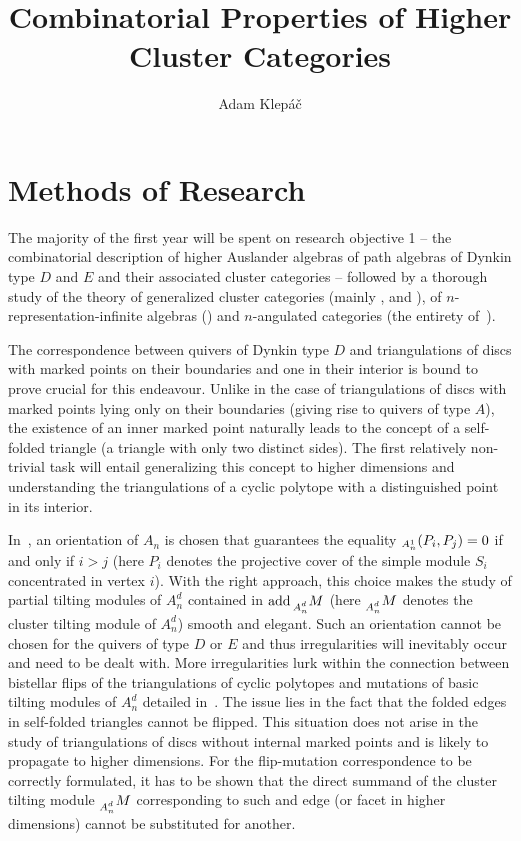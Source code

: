 \documentclass[a4paper,oneside,svgnames]{amsart}
\title{Combinatorial Properties of Higher Cluster Categories}
\author{Adam Klepáč}
\theoremstyle{plain}
\theoremstyle{definition}
\let\hom\relax
\DeclareMathOperator{\add}{add}
\DeclareMathOperator{\hom}{Hom}
\begin{document}
 \maketitle
 \section*{Methods of Research}
 \setcounter{section}{1}

 The majority of the first year will be spent on research objective 1 -- the
 combinatorial description of higher Auslander algebras of path algebras of
 Dynkin type $D$ and $E$ and their associated cluster categories -- followed by
 a thorough study of the theory of generalized cluster categories (mainly
 \cite[Sections 3 and 4]{amiot1}, \cite[Chapters 5,6 and 7]{amiot2} and
 \cite[Chapters 2 and 3]{guo}), of $n$-representation-infinite algebras
 (\cite[Sections 1-5]{hio}) and $n$-angulated categories (the entirety
 of~\cite{gko}).

 The correspondence between quivers of Dynkin type $D$ and triangulations of
 discs with marked points on their boundaries and one in their interior is bound
 to prove crucial for this endeavour. Unlike in the case of triangulations of
 discs with marked points lying only on their boundaries (giving rise to quivers
 of type $A$), the existence of an inner marked point naturally leads to the
 concept of a self-folded triangle (a triangle with only two distinct sides).
 The first relatively non-trivial task will entail generalizing this concept to
 higher dimensions and understanding the triangulations of a cyclic polytope
 with a distinguished point in its interior.

 In~\cite[Section 3]{ot}, an orientation of $A_n$ is chosen that guarantees the
 equality $\hom_{A^{1}_n}(P_i,P_j) = 0$ if and only if $i > j$ (here $P_i$ denotes the
 projective cover of the simple module $S_i$ concentrated in vertex $i$). With
 the right approach, this choice makes the study of partial tilting modules of
 $A^{d}_n$ contained in $\add \prescript{}{A^{d}_n}{M}$ (here
 $\prescript{}{A^{d}_n}{M}$ denotes the cluster tilting module of $A^{d}_n$)
 smooth and elegant. Such an orientation cannot be chosen for the quivers of
 type $D$ or $E$ and thus irregularities will inevitably occur and need to be
 dealt with. More irregularities lurk within the connection between bistellar
 flips of the triangulations of cyclic polytopes and mutations of basic tilting
 modules of $A^{d}_n$ detailed in~\cite[Section 4]{ot}. The issue lies in the
 fact that the folded edges in self-folded triangles cannot be flipped. This
 situation does not arise in the study of triangulations of discs without
 internal marked points and is likely to propagate to higher dimensions. For
 the flip-mutation correspondence to be correctly formulated, it has to be 
 shown that the direct summand of the cluster tilting module
 $\prescript{}{A^d_n}{M}$ corresponding to such and edge (or facet in higher
 dimensions) cannot be substituted for another.
\end{document}
